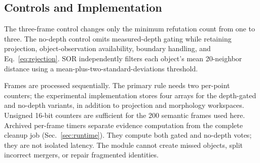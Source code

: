 \subsection{Controls and Implementation}
The three-frame control changes only the minimum refutation count from one to three. The no-depth control omits measured-depth gating while retaining projection, object-observation availability, boundary handling, and Eq.~\eqref{eq:rejection}. SOR independently filters each object's mean 20-neighbor distance using a mean-plus-two-standard-deviations threshold.

Frames are processed sequentially. The primary rule needs two per-point counters; the experimental implementation stores four arrays for the depth-gated and no-depth variants, in addition to projection and morphology workspaces. Unsigned 16-bit counters are sufficient for the 200 semantic frames used here. Archived per-frame timers separate evidence computation from the complete cleanup job (Sec.~\ref{sec:runtime}). They compute both gated and no-depth votes; they are not isolated \ours{} latency. The module cannot create missed objects, split incorrect mergers, or repair fragmented identities.

\begin{table}[t]
\centering
\caption{Observed-domain instance PQ ($\times100$) on four SceneNN test sequences. All methods use common frontend observations. Final stages: C = inherited CG denoise, object filter and guarded merge; M = native MaskClustering splitting, point filtering and overlap suppression; S = added SOR; V = added visibility-rule variant. C and M are different finalization pipelines. S/V operate on the identical finalized strong-baseline map, without rerunning C. \textbf{Bold} marks the best value in each column; shading identifies \ours{}, independently of rank. Shared-input external methods are adapted comparisons, not original full-pipeline reproductions.}
\label{tab:main}

\end{table}
